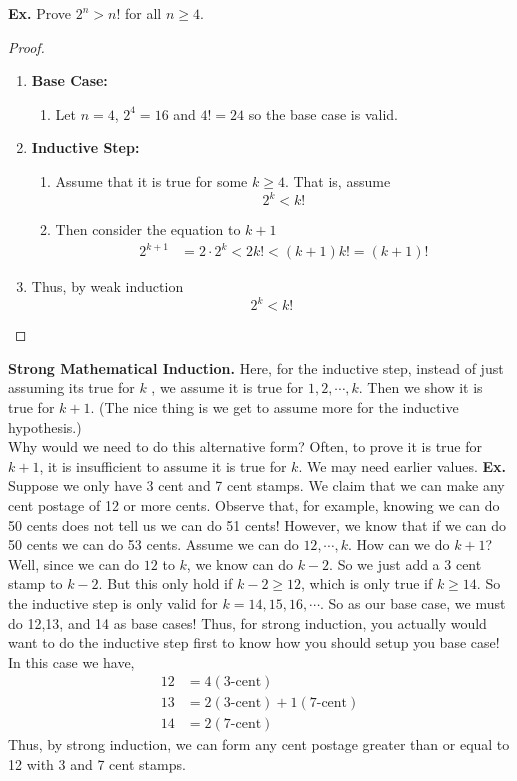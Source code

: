 \documentclass[class=article, crop=false]{standalone}
\begin{document}
\noindent\textbf{Ex.} Prove $2^n > n!$ for all $n\geq 4$.
\begin{proof}
	$ $\\
	\begin{enumerate}
		\item[] \textbf{Base Case:}
			\begin{enumerate}
				\item[] Let $n=4$, $2^4 = 16$ and $4!=24$ so the base case is valid.
			\end{enumerate} 
		\item[] \textbf{Inductive Step:}
			\begin{enumerate}
				\item[] Assume that it is true for some $k\geq 4$. That is, assume $$2^k < k!$$
				\item[] Then consider the equation to $k+1$
					\begin{align*}
						2^{k+1} &= 2 \cdot 2^k < 2k! < (k+1)k! = (k+1)!
					\end{align*}
			\end{enumerate}
		\item[] Thus, by weak induction $$2^k < k!$$
	\end{enumerate}
\end{proof}
\noindent\textbf{Strong Mathematical Induction.} Here, for the inductive step, instead of just assuming its true for $k$
, we assume it is true for $1,2,\cdots,k$. Then we show it is true for $k+1$. (The nice thing is we get to assume more for the inductive hypothesis.)\\
Why would we need to do this alternative form? Often, to prove it is true for $k+1$, it is insufficient to assume it is true
for $k$. We may need earlier values.
\textbf{Ex.} Suppose we only have 3 cent and 7 cent stamps. We claim that we can make any cent postage of 12 or more cents.
Observe that, for example, knowing we can do 50 cents does not tell us we can do 51 cents! However, we know that if we can do
50 cents we can do 53 cents. Assume we can do $12,\cdots,k$. How can we do $k+1$? Well, since we can do $12$ to $k$, we
know can do $k-2$. So we just add a 3 cent stamp to $k-2$. But this only hold if $k-2\geq 12$, which is only true if $k\geq 14$.
So the inductive step is only valid for $k=14,15,16,\cdots$. So as our base case, we must do 12,13, and 14 as base cases!
Thus, for strong induction, you actually would want to do the inductive step first to know how you should setup you base case!
In this case we have, 
\begin{align*}
	12 &= 4 (3\text{-cent}) \\
	13 &= 2 (3\text{-cent}) + 1 (7\text{-cent}) \\
	14 &= 2 (7\text{-cent})
\end{align*}
Thus, by strong induction, we can form any cent postage greater than or equal to 12 with 3 and 7 cent stamps.
\end{document}
